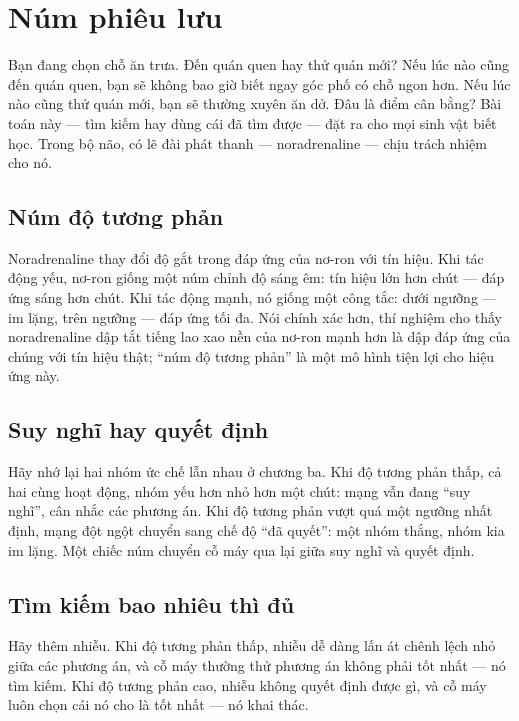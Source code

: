 \chapter{Núm phiêu lưu}

Bạn đang chọn chỗ ăn trưa. Đến quán quen hay thử quán mới? Nếu lúc nào cũng đến quán quen, bạn sẽ không bao giờ biết ngay góc phố có chỗ ngon hơn. Nếu lúc nào cũng thử quán mới, bạn sẽ thường xuyên ăn dở. Đâu là điểm cân bằng? Bài toán này --- tìm kiếm hay dùng cái đã tìm được --- đặt ra cho mọi sinh vật biết học. Trong bộ não, có lẽ đài phát thanh  --- noradrenaline --- chịu trách nhiệm cho nó.

\section*{Núm độ tương phản}

Noradrenaline thay đổi độ gắt trong đáp ứng của nơ-ron với tín hiệu. Khi tác động yếu, nơ-ron giống một núm chỉnh độ sáng êm: tín hiệu lớn hơn chút --- đáp ứng sáng hơn chút. Khi tác động mạnh, nó giống một công tắc: dưới ngưỡng --- im lặng, trên ngưỡng --- đáp ứng tối đa. Nói chính xác hơn, thí nghiệm cho thấy noradrenaline dập tắt tiếng lao xao nền của nơ-ron mạnh hơn là dập đáp ứng của chúng với tín hiệu thật; ``núm độ tương phản'' là một mô hình tiện lợi cho hiệu ứng này.


\section*{Suy nghĩ hay quyết định}

Hãy nhớ lại hai nhóm ức chế lẫn nhau ở chương ba. Khi độ tương phản thấp, cả hai cùng hoạt động, nhóm yếu hơn nhỏ hơn một chút: mạng vẫn đang ``suy nghĩ'', cân nhắc các phương án. Khi độ tương phản vượt quá một ngưỡng nhất định, mạng đột ngột chuyển sang chế độ ``đã quyết'': một nhóm thắng, nhóm kia im lặng. Một chiếc núm chuyển cỗ máy qua lại giữa suy nghĩ và quyết định.

\section*{Tìm kiếm bao nhiêu thì đủ}

Hãy thêm nhiễu. Khi độ tương phản thấp, nhiễu dễ dàng lấn át chênh lệch nhỏ giữa các phương án, và cỗ máy thường thử phương án không phải tốt nhất --- nó tìm kiếm. Khi độ tương phản cao, nhiễu không quyết định được gì, và cỗ máy luôn chọn cái nó cho là tốt nhất --- nó khai thác.

